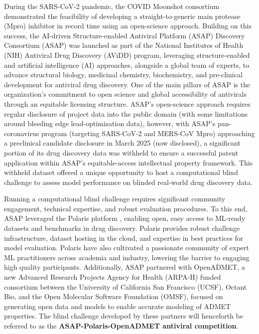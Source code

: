 \documentclass[journal=jcim,manuscript=article]{achemso}
\begin{document}
During the SARS-CoV-2 pandemic, the COVID Moonshot consortium demonstrated the feasibility of developing a straight-to-generic main protease (Mpro) inhibitor in record time using an open-science approach\cite{boby_2023}. Building on this success, the AI-driven Structure-enabled Antiviral Platform (ASAP) Discovery Consortium (ASAP)\cite{ASAP_website} was launched as part of the National Institutes of Health (NIH) Antiviral Drug Discovery (AViDD) program\cite{AVIDD_niaid_2022}, leveraging structure-enabled and artificial intelligence (AI) approaches, alongside a global team of experts, to advance structural biology, medicinal chemistry, biochemistry, and pre-clinical development for antiviral drug discovery. One of the main pillars of ASAP is the organization's commitment to open science and global accessibility of antivirals through an equitable licensing structure\cite{griffen_2024}. ASAP's open-science approach requires regular disclosure of project data into the public domain (with some limitations around bleeding edge lead-optimization data), however, with ASAP's pan-coronavirus program (targeting SARS-CoV-2 and MERS-CoV Mpro\cite{sars_mers_tcp}) approaching a preclinical candidate disclosure in March 2025 (now disclosed)\cite{griffen_2025_acs}, a significant portion of its drug discovery data was withheld to ensure a successful patent application within ASAP's equitable-access intellectual property framework. This withheld dataset offered a unique opportunity to host a computational blind challenge to assess model performance on blinded real-world drug discovery data.


Running a computational blind challenge requires significant community engagement, technical expertise, and robust evaluation procedures. To this end, ASAP leveraged the Polaris platform \cite{wognum_call_2024, Polaris_website, wognum_polaris-hubpolaris_2025}, enabling open, easy access to ML-ready datasets and benchmarks in drug discovery. Polaris provides robust challenge infrastructure, dataset hosting in the cloud, and expertise in best practices for model evaluation. Polaris have also cultivated a passionate community of expert ML practitioners across academia and industry, lowering the barrier to engaging high quality participants. Additionally, ASAP partnered with OpenADMET, a new Advanced Research Projects Agency for Health (ARPA-H)\cite{ARPAH_website} funded consortium between the University of California San Francisco (UCSF), Octant Bio\cite{Octant_website}, and the Open Molecular Software Foundation (OMSF)\cite{OMSF_website}, focused on generating open data and models to enable accurate modeling of ADMET properties. The blind challenge developed by these partners will henceforth be referred to as the \textbf{ASAP-Polaris-OpenADMET antiviral competition}.
\end{document}
